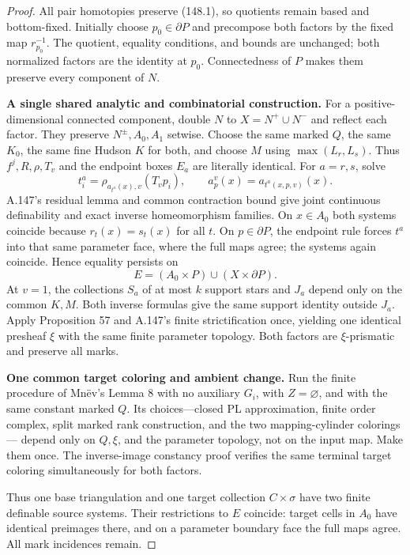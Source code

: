 \begin{proof}
All pair homotopies preserve (148.1), so quotients remain based and
bottom-fixed. Initially choose \(p_0\in\partial P\) and precompose both
factors by the fixed map \(r_{p_0}^{-1}\). The quotient, equality
conditions, and bounds are unchanged; both normalized factors are the
identity at \(p_0\). Connectedness of \(P\) makes them preserve every
component of \(N\).

\textbf{A single shared analytic and combinatorial construction.}
For a positive-dimensional connected component, double \(N\) to
\(X=N^+\cup N^-\) and reflect each factor. They preserve
\(N^\pm,A_0,A_1\) setwise. Choose the same marked \(Q\), the same
\(K_0\), the same fine Hudson \(K\) for both, and choose \(M\) using
\(\max(L_r,L_s)\). Thus \(f^j,R,\rho,T_v\) and the endpoint boxes
\(E_a\) are literally identical. For \(a=r,s\), solve
\[
 t_i^a=\rho_{a_{t^a}(x),v}(T_vp_i),\qquad
 a_p^v(x)=a_{t^a(x,p,v)}(x).
 \tag{148.2}
\]
A.147's residual lemma and common contraction bound give joint
continuous definability and exact inverse homeomorphism families.
On \(x\in A_0\) both systems coincide because \(r_t(x)=s_t(x)\) for
all \(t\). On \(p\in\partial P\), the endpoint rule forces \(t^a\)
into that same parameter face, where the full maps agree; the systems
again coincide. Hence equality persists on
\[
 E=(A_0\times P)\cup(X\times\partial P).
 \tag{148.3}
\]
At \(v=1\), the collections \(S_a\) of at most \(k\) support stars
and \(J_a\) depend only on the common \(K,M\). Both inverse formulas
give the same support identity outside \(J_a\). Apply Proposition 57
and A.147's finite strictification once, yielding one identical
presheaf \(\xi\) with the same finite parameter topology. Both factors
are \(\xi\)-prismatic and preserve all marks.

\textbf{One common target coloring and ambient change.}
Run the finite procedure of Mn\"ev's Lemma 8 with no auxiliary \(G_i\),
with \(Z=\varnothing\), and with the same constant marked \(Q\).
Its choices---closed PL approximation, finite order complex, split
marked rank construction, and the two mapping-cylinder colorings---
depend only on \(Q,\xi\), and the parameter topology, not on the input
map. Make them once. The inverse-image constancy proof verifies the
same terminal target coloring simultaneously for both factors.

Thus one base triangulation and one target collection
\(C\times\sigma\) have two finite definable source systems.
Their restrictions to \(E\) coincide: target cells in \(A_0\) have
identical preimages there, and on a parameter boundary face the full
maps agree. All mark incidences remain.


\end{proof}
